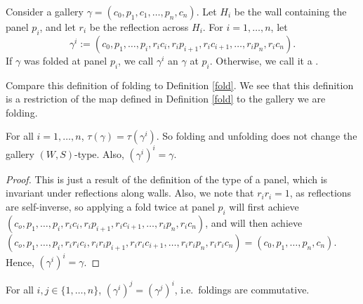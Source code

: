 \documentclass[11pt]{article}
\begin{document}
\begin{definition}
    Consider a gallery $\gamma = (c_0,p_1,c_1,\hdots ,p_n,c_n)$. Let $H_i$ be the wall containing the panel $p_i$, and let $r_i$ be the reflection across $H_i$. For $i=1,\hdots ,n$, let
    \[\gamma^i:=(c_0,p_1,\hdots ,p_i,r_ic_i,r_ip_{i+1},r_ic_{i+1},\hdots ,r_ip_n,r_ic_n).\]
    If $\gamma$ was folded at panel $p_i$, we call $\gamma^i$ an $\gamma$ at $p_i$. Otherwise, we call it a .
\end{definition}

Compare this definition of folding to Definition \ref{fold}. We see that this definition is a restriction of the map defined in Definition \ref{fold} to the gallery we are folding. 
\begin{lemma}
    For all $i=1,\hdots ,n$, $\tau(\gamma)=\tau(\gamma^i)$. So folding and unfolding does not change the gallery $(W,S)$-type. Also, $(\gamma^i)^i=\gamma$.
\end{lemma}

\begin{proof}
    This is just a result of the definition of the type of a panel, which is invariant under reflections along walls. Also, we note that $r_ir_i=1$, as reflections are self-inverse, so applying a fold twice at panel $p_i$ will first achieve $(c_o,p_1,\hdots,p_i,r_ic_i,r_ip_{i+1},r_ic_{i+1},\hdots ,r_ip_n,r_ic_n)$, and will then achieve $(c_o,p_1,\hdots ,p_i,r_ir_ic_i,r_ir_ip_{i+1},r_ir_ic_{i+1},\hdots ,r_ir_ip_n,r_ir_ic_n)=(c_0,p_1,\hdots ,p_n,c_n)$. Hence, $(\gamma^i)^i=\gamma$.
\end{proof}

\begin{lemma}
    For all $i,j\in\{1,\hdots,n\}$, $(\gamma^i)^j=(\gamma^j)^i$, i.e.\ foldings are commutative.
\end{lemma}
\end{document}
